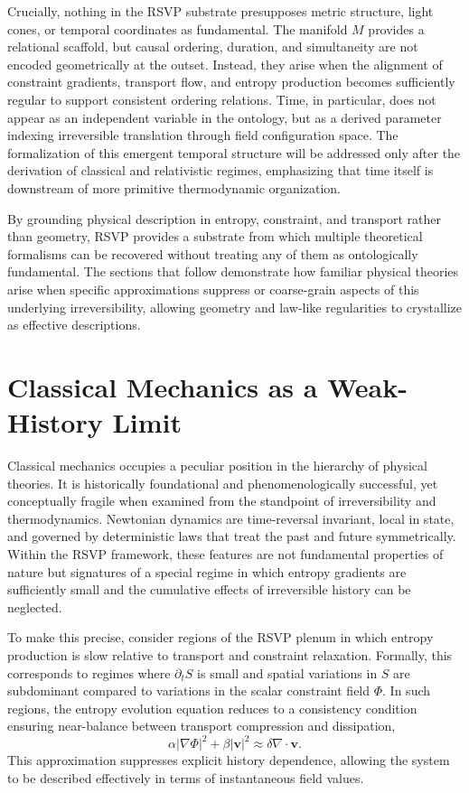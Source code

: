\documentclass[11pt]{article}
\begin{document}
Crucially, nothing in the RSVP substrate presupposes metric structure, light cones, or temporal coordinates as fundamental. The manifold $M$ provides a relational scaffold, but causal ordering, duration, and simultaneity are not encoded geometrically at the outset. Instead, they arise when the alignment of constraint gradients, transport flow, and entropy production becomes sufficiently regular to support consistent ordering relations. Time, in particular, does not appear as an independent variable in the ontology, but as a derived parameter indexing irreversible translation through field configuration space. The formalization of this emergent temporal structure will be addressed only after the derivation of classical and relativistic regimes, emphasizing that time itself is downstream of more primitive thermodynamic organization.

By grounding physical description in entropy, constraint, and transport rather than geometry, RSVP provides a substrate from which multiple theoretical formalisms can be recovered without treating any of them as ontologically fundamental. The sections that follow demonstrate how familiar physical theories arise when specific approximations suppress or coarse-grain aspects of this underlying irreversibility, allowing geometry and law-like regularities to crystallize as effective descriptions.

\section{Classical Mechanics as a Weak-History Limit}

Classical mechanics occupies a peculiar position in the hierarchy of physical theories. It is historically foundational and phenomenologically successful, yet conceptually fragile when examined from the standpoint of irreversibility and thermodynamics. Newtonian dynamics are time-reversal invariant, local in state, and governed by deterministic laws that treat the past and future symmetrically. Within the RSVP framework, these features are not fundamental properties of nature but signatures of a special regime in which entropy gradients are sufficiently small and the cumulative effects of irreversible history can be neglected.

To make this precise, consider regions of the RSVP plenum in which entropy production is slow relative to transport and constraint relaxation. Formally, this corresponds to regimes where $\partial_t S$ is small and spatial variations in $S$ are subdominant compared to variations in the scalar constraint field $\Phi$. In such regions, the entropy evolution equation reduces to a consistency condition ensuring near-balance between transport compression and dissipation,
\begin{equation}
\alpha \lvert \nabla \Phi \rvert^2 + \beta \lvert \mathbf{v} \rvert^2 \approx \delta \nabla \cdot \mathbf{v}.
\end{equation}
This approximation suppresses explicit history dependence, allowing the system to be described effectively in terms of instantaneous field values.
\end{document}
